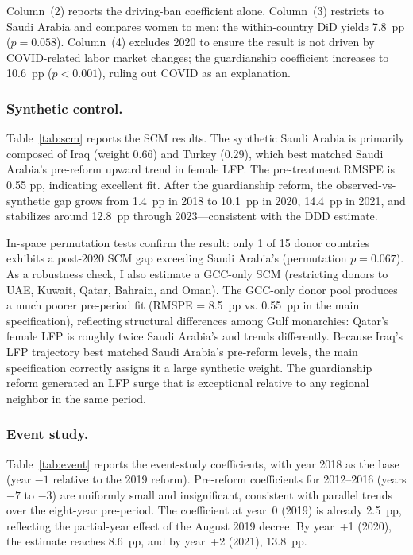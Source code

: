 \documentclass[12pt]{article}
\begin{document}
Column~(2) reports the driving-ban coefficient alone. Column~(3) restricts to Saudi Arabia and compares women to men: the within-country DiD yields 7.8~pp ($p = 0.058$). Column~(4) excludes 2020 to ensure the result is not driven by COVID-related labor market changes; the guardianship coefficient increases to 10.6~pp ($p < 0.001$), ruling out COVID as an explanation.



\subsubsection*{Synthetic control.} Table~\ref{tab:scm} reports the SCM results. The synthetic Saudi Arabia is primarily composed of Iraq (weight 0.66) and Turkey (0.29), which best matched Saudi Arabia's pre-reform upward trend in female LFP. The pre-treatment RMSPE is 0.55 pp, indicating excellent fit. After the guardianship reform, the observed-vs-synthetic gap grows from 1.4~pp in 2018 to 10.1~pp in 2020, 14.4~pp in 2021, and stabilizes around 12.8~pp through 2023---consistent with the DDD estimate.

In-space permutation tests confirm the result: only 1 of 15 donor countries exhibits a post-2020 SCM gap exceeding Saudi Arabia's (permutation $p = 0.067$). As a robustness check, I also estimate a GCC-only SCM (restricting donors to UAE, Kuwait, Qatar, Bahrain, and Oman). The GCC-only donor pool produces a much poorer pre-period fit (RMSPE = 8.5~pp vs. 0.55~pp in the main specification), reflecting structural differences among Gulf monarchies: Qatar's female LFP is roughly twice Saudi Arabia's and trends differently. Because Iraq's LFP trajectory best matched Saudi Arabia's pre-reform levels, the main specification correctly assigns it a large synthetic weight. The guardianship reform generated an LFP surge that is exceptional relative to any regional neighbor in the same period.



\subsubsection*{Event study.} Table~\ref{tab:event} reports the event-study coefficients, with year 2018 as the base (year $-1$ relative to the 2019 reform). Pre-reform coefficients for 2012--2016 (years $-7$ to $-3$) are uniformly small and insignificant, consistent with parallel trends over the eight-year pre-period. The coefficient at year~0 (2019) is already 2.5~pp, reflecting the partial-year effect of the August 2019 decree. By year~+1 (2020), the estimate reaches 8.6~pp, and by year~+2 (2021), 13.8~pp.
\end{document}
